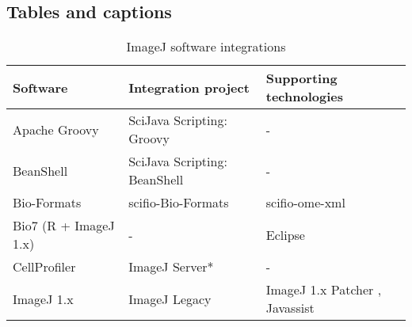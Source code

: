\documentclass{bmcart}
\begin{document}
\begin{backmatter}
\FloatBarrier


\section*{Tables and captions}
  \setcounter{table}{0}

  \begin{table}[h!]
    \caption{ImageJ software integrations}
    \begin{tabular}{| l | l | l |}
      \hline
      \textbf{Software}                                                  & \textbf{Integration project}                                         & \textbf{Supporting technologies}                                           \\ \hline
      Apache Groovy                               \cite{groovy}          & SciJava Scripting: Groovy             \cite{scripting_groovy}        & -                                                                          \\ \hline
      BeanShell                                   \cite{beanshell}       & SciJava Scripting: BeanShell          \cite{scripting_beanshell}     & -                                                                          \\ \hline
      Bio-Formats                                 \cite{bio_formats}     & \acrshort{scifio}-Bio-Formats         \cite{scifio_bf_compat}        & \acrshort{scifio}-\acrshort{ome}-\acrshort{xml}     \cite{scifio_ome_xml}  \\ \hline
      Bio7 (R + ImageJ 1.x)                       \cite{bio7}            & -                                                                    & Eclipse                                             \cite{eclipse}         \\ \hline
      CellProfiler                                \cite{cellprofiler}    & ImageJ Server*                        \cite{imagej_server}           & -                                                                          \\ \hline
      ImageJ 1.x                                  \cite{imagej_history}  & ImageJ Legacy                         \cite{imagej_legacy}           & ImageJ 1.x Patcher \cite{ij1_patcher}, Javassist    \cite{javassist}       \\ \hline

\end{tabular}
\end{table}
\end{backmatter}
\end{document}
